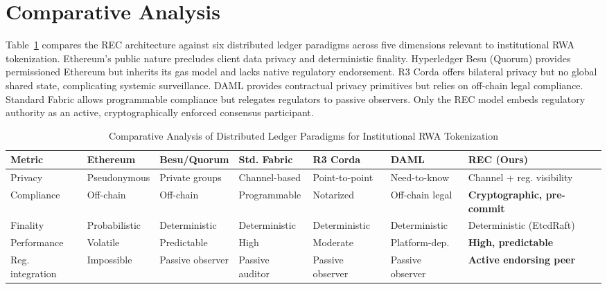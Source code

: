 \documentclass[journal,10pt,twocolumn]{IEEEtran}
\begin{document}
\section{Comparative Analysis}
\label{sec:comparison}

Table~\ref{tab:comparison} compares the REC architecture against six distributed ledger paradigms across five dimensions relevant to institutional RWA tokenization. Ethereum's public nature precludes client data privacy and deterministic finality. Hyperledger Besu (Quorum) provides permissioned Ethereum but inherits its gas model and lacks native regulatory endorsement. R3 Corda offers bilateral privacy but no global shared state, complicating systemic surveillance. DAML provides contractual privacy primitives but relies on off-chain legal compliance. Standard Fabric allows programmable compliance but relegates regulators to passive observers. Only the REC model embeds regulatory authority as an active, cryptographically enforced consensus participant.

\begin{table}[t]
\centering
\caption{Comparative Analysis of Distributed Ledger Paradigms for Institutional RWA Tokenization}
\label{tab:comparison}
\begin{tabularx}{\textwidth}{@{}lXXXXXX@{}}
\toprule
\textbf{Metric} & \textbf{Ethereum} & \textbf{Besu/Quorum} & \textbf{Std. Fabric} & \textbf{R3 Corda} & \textbf{DAML} & \textbf{REC (Ours)} \\
\midrule
Privacy & Pseudonymous & Private groups & Channel-based & Point-to-point & Need-to-know & Channel + reg. visibility \\
Compliance & Off-chain & Off-chain & Programmable & Notarized & Off-chain legal & \textbf{Cryptographic, pre-commit} \\
Finality & Probabilistic & Deterministic & Deterministic & Deterministic & Deterministic & Deterministic (EtcdRaft) \\
Performance & Volatile & Predictable & High & Moderate & Platform-dep. & \textbf{High, predictable} \\
Reg. integration & Impossible & Passive observer & Passive auditor & Passive observer & Passive observer & \textbf{Active endorsing peer} \\
\bottomrule
\end{tabularx}
\end{table}
\end{document}

